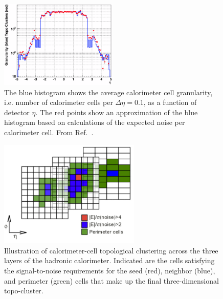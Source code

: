 \begin{figure}[!htb]
    \begin{center}
        \includegraphics[width=0.5\textwidth]{figures/chapter3/jets/calocell_granularity}
        \caption{
            The blue histogram shows the average calorimeter cell granularity, i.e. number of calorimeter cells per
            $\Delta \eta = 0.1$, as a function of detector $\eta$. The red points show an approximation of the blue
            histogram based on calculations of the expected noise per calorimeter cell.
            From Ref.~\cite{Lampl:2008zz}.
        }
        \label{fig:calocell_granularity}
    \end{center}
\end{figure}

\begin{figure}[!htb]
    \begin{center}
    \includegraphics[width=0.6\textwidth]{figures/chapter3/jets/calocell_clustering_cartoon}
    \caption{
        Illustration of calorimeter-cell topological clustering across the three layers of the
        hadronic calorimeter. Indicated are the cells satisfying the signal-to-noise requirements for
        the seed (red), neighbor (blue), and perimeter (green) cells that make up the final three-dimensional topo-cluster.
    }
    \label{fig:calocell_clustering}
    \end{center}
\end{figure}
\FloatBarrier

